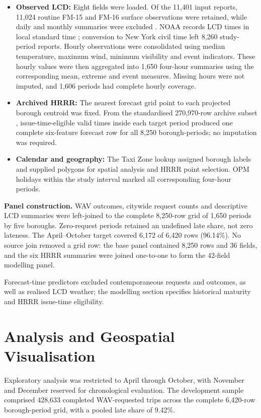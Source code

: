 \documentclass[11pt]{article}
\begin{document}
\begin{itemize}
    \setlength\itemsep{0pt}
    \setlength\parskip{0pt}
    \setlength\parsep{0pt}
    \item \textbf{Observed LCD:} Eight fields were loaded. Of the 11,401 input
    reports, 11,024 routine FM-15 and FM-16 surface observations were retained,
    while daily and monthly summaries were excluded
    \cite{noaa_surface_report_types}. NOAA records LCD times in local standard
    time \cite{noaa_lcd_documentation}; conversion to New York civil time left
    8,260 study-period reports. Hourly observations were consolidated using median
    temperature, maximum wind, minimum visibility and event indicators. These hourly
    values were then aggregated into 1,650 four-hour summaries using the corresponding
    mean, extreme and event measures. Missing hours were not imputed, and 1,606 periods
    had complete hourly coverage.
    \item \textbf{Archived HRRR:} The nearest forecast grid point to each
    projected borough centroid was fixed. From the standardised 270,970-row
    archive subset \cite{dynamical_hrrr}, issue-time-eligible valid times inside
    each target period produced one complete six-feature forecast row for all
    8,250 borough-periods; no imputation was required.
    \item \textbf{Calendar and geography:} The Taxi Zone lookup
    \cite{nyctlc_taxi_zones} assigned borough labels and supplied polygons for
    spatial analysis and HRRR point selection. OPM holidays within the study
    interval \cite{opm_holidays} marked all corresponding four-hour periods.
\end{itemize}

\textbf{Panel construction.}
WAV outcomes, citywide request counts and descriptive LCD summaries were
left-joined to the complete 8,250-row grid of 1,650 periods by five boroughs.
Zero-request periods retained an undefined late share, not zero lateness. The
April--October target covered 6,172 of 6,420 rows (96.14\%). No source join
removed a grid row: the base panel contained 8,250 rows and 36 fields, and
the six HRRR summaries were joined one-to-one to form the 42-field modelling
panel.

Forecast-time predictors excluded contemporaneous requests and outcomes, as
well as realised LCD weather; the modelling section specifies historical
maturity and HRRR issue-time eligibility.

\section{Analysis and Geospatial Visualisation}
Exploratory analysis was restricted to April through October, with November and
December reserved for chronological evaluation. The development sample comprised
428,633 completed WAV-requested trips across the complete 6,420-row
borough-period grid, with a pooled late share of 9.42\%.
\end{document}
